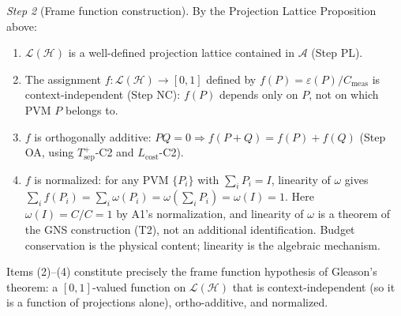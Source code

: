 \documentclass[11pt]{article}
\theoremstyle{remark}
\begin{document}
\begin{tcolorbox}[apfbox, title={$T_{\mathrm{Born}}$: Born Rule from Admissibility Invariance}]
\textit{Step 2} (Frame function construction).  By the Projection Lattice Proposition above:
\begin{enumerate}[nosep,leftmargin=2em]
\item $\mathcal{L}(\mathcal{H})$ is a well-defined projection lattice contained in $\mathcal{A}$ (Step PL).
\item The assignment $f: \mathcal{L}(\mathcal{H}) \to [0,1]$ defined by $f(P) = \varepsilon(P)/C_{\mathrm{meas}}$ is context-independent (Step NC): $f(P)$ depends only on $P$, not on which PVM $P$ belongs to.
\item $f$ is orthogonally additive: $PQ = 0 \Rightarrow f(P+Q) = f(P) + f(Q)$ (Step OA, using $T_{\mathrm{sep}}^+$-C2 and $L_{\mathrm{cost}}$-C2).
\item $f$ is normalized: for any PVM $\{P_i\}$ with $\sum_i P_i = I$, linearity of $\omega$ gives $\sum_i f(P_i) = \sum_i \omega(P_i) = \omega\!\left(\sum_i P_i\right) = \omega(I) = 1$.  Here $\omega(I) = C/C = 1$ by A1's normalization, and linearity of $\omega$ is a theorem of the GNS construction (T2), not an additional identification.  Budget conservation is the physical content; linearity is the algebraic mechanism.
\end{enumerate}
Items (2)--(4) constitute precisely the frame function hypothesis of Gleason's theorem: a $[0,1]$-valued function on $\mathcal{L}(\mathcal{H})$ that is context-independent (so it is a function of projections alone), ortho-additive, and normalized.


\end{tcolorbox}
\end{document}
